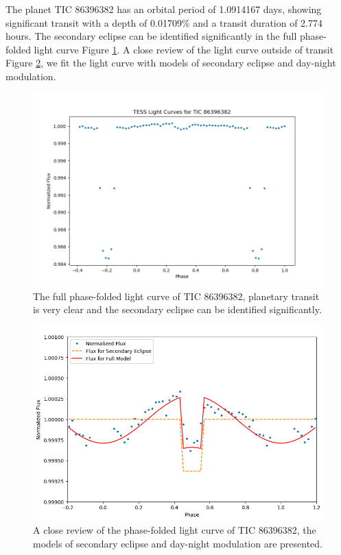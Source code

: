 \documentclass{article}
\begin{document}
The planet TIC 86396382 has an orbital period of 1.0914167 days, showing significant transit with a depth of 0.01709\% and a transit duration of 2.774 hours. The secondary eclipse can be identified significantly in the full phase-folded light curve Figure \ref{fig:86396382_folded}. A close review of the light curve outside of transit Figure \ref{fig:86396382}, we fit the light curve with models of secondary eclipse and day-night modulation.\begin{figure}[H]\centering\includegraphics[width=0.7\linewidth]{image/86396382_folded.png}
\captionsetup{font=small} 
\caption{The full phase-folded light curve of TIC 86396382, planetary transit is very clear and the secondary eclipse can be identified significantly.}\label{fig:86396382_folded}\end{figure}\begin{figure}[H]\centering\includegraphics[width=0.65\linewidth]{image/86396382.png}
\captionsetup{font=small} 
\caption{A close review of the phase-folded light curve of TIC 86396382, the models of secondary eclipse and day-night modulation are presented.}\label{fig:86396382}\end{figure}
\newpage
\end{document}
